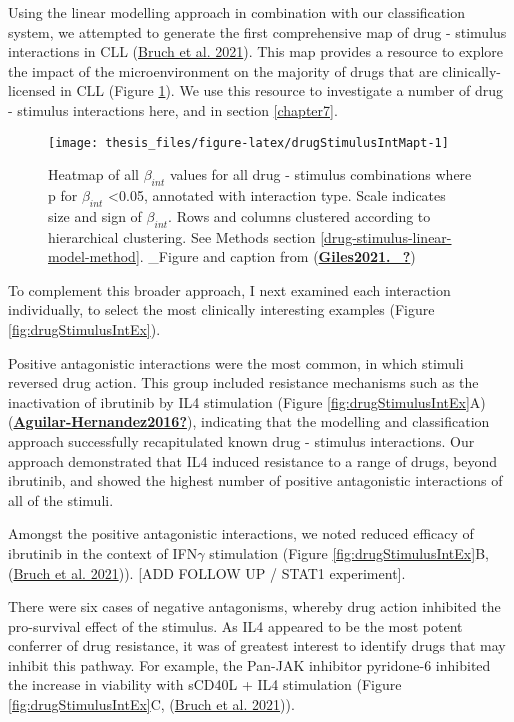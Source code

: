 \documentclass[11pt, a4paper, twosided]{book}
\begin{document}
Using the linear modelling approach in combination with our classification system, we attempted to generate the first comprehensive map of drug - stimulus interactions in CLL (\protect\hyperlink{ref-Giles2021}{Bruch et al. 2021}). This map provides a resource to explore the impact of the microenvironment on the majority of drugs that are clinically-licensed in CLL (Figure \ref{fig:drugStimulusIntMapt}). We use this resource to investigate a number of drug - stimulus interactions here, and in section \ref{chapter7}.


\begin{figure}

{\centering \texttt{[image: thesis\_files/figure-latex/drugStimulusIntMapt-1]} 

}

\caption{Heatmap of all \(\beta_{int}\) values for all drug - stimulus combinations where p for \(\beta_{int}\) \textless0.05, annotated with interaction type. Scale indicates size and sign of \(\beta_{int}\). Rows and columns clustered according to hierarchical clustering. See Methods section \ref{drug-stimulus-linear-model-method}. \_Figure and caption from (\protect\hyperlink{ref-Giles2021._}{\textbf{Giles2021.\_?}})}\label{fig:drugStimulusIntMapt}
\end{figure}
To complement this broader approach, I next examined each interaction individually, to select the most clinically interesting examples (Figure \ref{fig:drugStimulusIntEx}).

Positive antagonistic interactions were the most common, in which stimuli reversed drug action. This group included resistance mechanisms such as the inactivation of ibrutinib by IL4 stimulation (Figure \ref{fig:drugStimulusIntEx}A)(\protect\hyperlink{ref-Aguilar-Hernandez2016}{\textbf{Aguilar-Hernandez2016?}}), indicating that the modelling and classification approach successfully recapitulated known drug - stimulus interactions. Our approach demonstrated that IL4 induced resistance to a range of drugs, beyond ibrutinib, and showed the highest number of positive antagonistic interactions of all of the stimuli.

Amongst the positive antagonistic interactions, we noted reduced efficacy of ibrutinib in the context of IFN\(\gamma\) stimulation (Figure \ref{fig:drugStimulusIntEx}B, (\protect\hyperlink{ref-Giles2021}{Bruch et al. 2021})). {[}ADD FOLLOW UP / STAT1 experiment{]}.

There were six cases of negative antagonisms, whereby drug action inhibited the pro-survival effect of the stimulus. As IL4 appeared to be the most potent conferrer of drug resistance, it was of greatest interest to identify drugs that may inhibit this pathway. For example, the Pan-JAK inhibitor pyridone-6 inhibited the increase in viability with sCD40L + IL4 stimulation (Figure \ref{fig:drugStimulusIntEx}C, (\protect\hyperlink{ref-Giles2021}{Bruch et al. 2021})).
\end{document}
